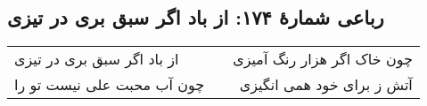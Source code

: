 \begin{center}
\section*{رباعی شمارهٔ ۱۷۴: از باد اگر سبق بری در تیزی}
\label{sec:174}
\begin{longtable}{l p{0.5cm} r}
از باد اگر سبق بری در تیزی
&&
چون خاک اگر هزار رنگ آمیزی
\\
چون آب محبت علی نیست تو را
&&
آتش ز برای خود همی انگیزی
\\
\end{longtable}
\end{center}

